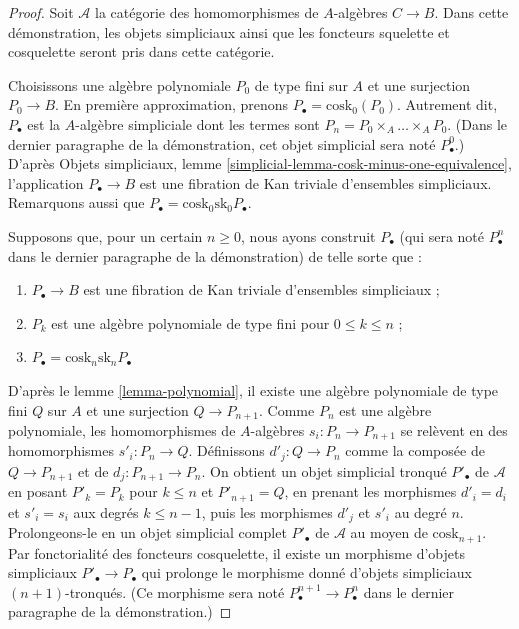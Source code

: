 \begin{proof}
Soit $\mathcal{A}$ la catégorie des homomorphismes de $A$-algèbres $C \to B$.
Dans cette démonstration, les objets simpliciaux ainsi que les foncteurs
squelette et cosquelette seront pris dans cette catégorie.

\medskip\noindent
Choisissons une algèbre polynomiale $P_0$ de type fini sur $A$ et une
surjection $P_0 \to B$. En première approximation, prenons
$P_\bullet = \text{cosk}_0(P_0)$. Autrement dit, $P_\bullet$ est la
$A$-algèbre simpliciale dont les termes sont
$P_n = P_0 \times_A \ldots \times_A P_0$. (Dans le dernier paragraphe de la
démonstration, cet objet simplicial sera noté $P^0_\bullet$.) D'après Objets
simpliciaux, lemme \ref{simplicial-lemma-cosk-minus-one-equivalence},
l'application $P_\bullet \to B$ est une fibration de Kan triviale d'ensembles
simpliciaux. Remarquons aussi que
$P_\bullet = \text{cosk}_0 \text{sk}_0 P_\bullet$.

\medskip\noindent
Supposons que, pour un certain $n \geq 0$, nous ayons construit $P_\bullet$
(qui sera noté $P^n_\bullet$ dans le dernier paragraphe de la démonstration)
de telle sorte que :
\begin{enumerate}
\item[(a)] $P_\bullet \to B$ est une fibration de Kan triviale d'ensembles
simpliciaux ;
\item[(b)] $P_k$ est une algèbre polynomiale de type fini pour
$0 \leq k \leq n$ ;
\item[(c)] $P_\bullet = \text{cosk}_n \text{sk}_n P_\bullet$
\end{enumerate}
D'après le lemme \ref{lemma-polynomial}, il existe une algèbre polynomiale de
type fini $Q$ sur $A$ et une surjection $Q \to P_{n + 1}$. Comme $P_n$ est une
algèbre polynomiale, les homomorphismes de $A$-algèbres
$s_i : P_n \to P_{n + 1}$ se relèvent en des homomorphismes
$s'_i : P_n \to Q$. Définissons $d'_j : Q \to P_n$ comme la composée de
$Q \to P_{n + 1}$ et de $d_j : P_{n + 1} \to P_n$. On obtient un objet
simplicial tronqué $P'_\bullet$ de $\mathcal{A}$ en posant $P'_k = P_k$ pour
$k \leq n$ et $P'_{n + 1} = Q$, en prenant les morphismes $d'_i = d_i$ et
$s'_i = s_i$ aux degrés $k \leq n - 1$, puis les morphismes $d'_j$ et $s'_i$
au degré $n$. Prolongeons-le en un objet simplicial complet $P'_\bullet$ de
$\mathcal{A}$ au moyen de $\text{cosk}_{n + 1}$. Par fonctorialité des
foncteurs cosquelette, il existe un morphisme d'objets simpliciaux
$P'_\bullet \to P_\bullet$ qui prolonge le morphisme donné d'objets simpliciaux
$(n + 1)$-tronqués. (Ce morphisme sera noté
$P^{n + 1}_\bullet \to P^n_\bullet$ dans le dernier paragraphe de la
démonstration.)


\end{proof}

